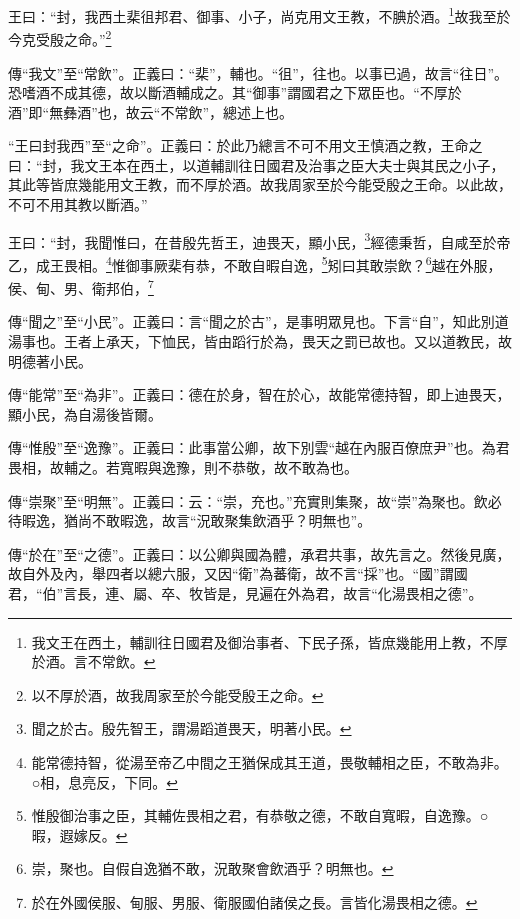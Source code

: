王曰：“封，我西土棐徂邦君、御事、小子，尚克用文王教，不腆於酒。\footnote{我文王在西土，輔訓往日國君及御治事者、下民子孫，皆庶幾能用上教，不厚於酒。言不常飲。}故我至於今克受殷之命。”\footnote{以不厚於酒，故我周家至於今能受殷王之命。}


{\noindent\zhuan{}\fzbyks 傳“我文”至“常飲”。正義曰：“棐”，輔也。“徂”，往也。以事已過，故言“往日”。恐嗜酒不成其德，故以斷酒輔成之。其“御事”謂國君之下眾臣也。“不厚於酒”即“無彝酒”也，故云“不常飲”，總述上也。 \par}

{\noindent\shu{}\fzkt “王曰封我西”至“之命”。正義曰：於此乃總言不可不用文王慎酒之教，王命之曰：“封，我文王本在西土，以道輔訓往日國君及治事之臣大夫士與其民之小子，其此等皆庶幾能用文王教，而不厚於酒。故我周家至於今能受殷之王命。以此故，不可不用其教以斷酒。” \par}

王曰：“封，我聞惟曰，在昔殷先哲王，迪畏天，顯小民，\footnote{聞之於古。殷先智王，謂湯蹈道畏天，明著小民。}經德秉哲，自咸至於帝乙，成王畏相。\footnote{能常德持智，從湯至帝乙中間之王猶保成其王道，畏敬輔相之臣，不敢為非。○相，息亮反，下同。}惟御事厥棐有恭，不敢自暇自逸，\footnote{惟殷御治事之臣，其輔佐畏相之君，有恭敬之德，不敢自寬暇，自逸豫。○暇，遐嫁反。}矧曰其敢崇飲？\footnote{崇，聚也。自假自逸猶不敢，況敢聚會飲酒乎？明無也。}越在外服，侯、甸、男、衛邦伯，\footnote{於在外國侯服、甸服、男服、衛服國伯諸侯之長。言皆化湯畏相之德。}

{\noindent\zhuan{}\fzbyks 傳“聞之”至“小民”。正義曰：言“聞之於古”，是事明眾見也。下言“自”，知此別道湯事也。王者上承天，下恤民，皆由蹈行於為，畏天之罰已故也。又以道教民，故明德著小民。 \par}

{\noindent\zhuan{}\fzbyks 傳“能常”至“為非”。正義曰：德在於身，智在於心，故能常德持智，即上迪畏天，顯小民，為自湯後皆爾。 \par}

{\noindent\zhuan{}\fzbyks 傳“惟殷”至“逸豫”。正義曰：此事當公卿，故下別雲“越在內服百僚庶尹”也。為君畏相，故輔之。若寬暇與逸豫，則不恭敬，故不敢為也。 \par}

{\noindent\zhuan{}\fzbyks 傳“崇聚”至“明無”。正義曰：云：“崇，充也。”充實則集聚，故“崇”為聚也。飲必待暇逸，猶尚不敢暇逸，故言“況敢聚集飲酒乎？明無也”。 \par}

{\noindent\zhuan{}\fzbyks 傳“於在”至“之德”。正義曰：以公卿與國為體，承君共事，故先言之。然後見廣，故自外及內，舉四者以總六服，又因“衛”為蕃衛，故不言“採”也。“國”謂國君，“伯”言長，連、屬、卒、牧皆是，見遍在外為君，故言“化湯畏相之德”。 \par}

